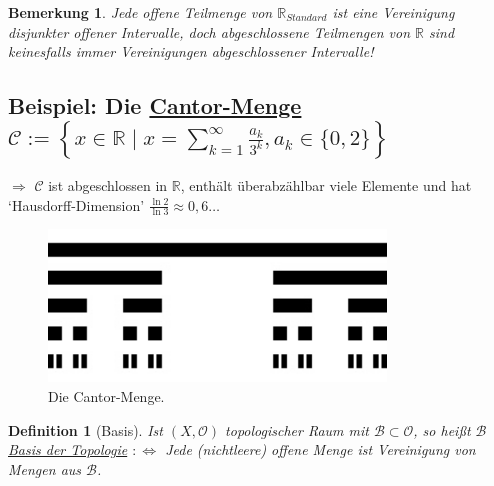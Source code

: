 \documentclass[a4paper,11pt,notitlepage]{report}
\newtheorem{definition}{Definition}[chapter]
\newtheorem{remark}{Bemerkung}[chapter]
\newcommand{\R}{{\ensuremath{\mathbb{R}}}}
\newcommand{\OO}{{\ensuremath{\mathcal{O}}}}
\newenvironment{bsp}[1]
{
\setlength{\fboxsep}{10pt}
\subsection*{Beispiel: #1}
\begin{upshape}
}
{
\end{upshape}
}
\begin{document}
\begin{remark}
	Jede offene Teilmenge von $\R_{Standard}$ ist eine Vereinigung disjunkter offener Intervalle, doch abgeschlossene Teilmengen von $\R$ sind keinesfalls immer Vereinigungen abgeschlossener Intervalle!
\end{remark}

\begin{bsp}{Die \underline{Cantor-Menge} $\mathcal{C}:= \left \{ x \in \R \mid x = \sum\limits_{k=1}^{\infty}{\frac{a_k}{3^k}}, a_k \in \{0,2\} \right \}$}
	$\Rightarrow$ $\mathcal{C}$ ist abgeschlossen in $\R$, enthält überabzählbar viele Elemente und hat `Hausdorff-Dimension' $\frac{\ln 2}{\ln 3} \approx 0,6 \ldots$
\end{bsp}

\begin{figure}[h]
\centering
\includegraphics[width=0.8\textwidth]{images/Cantormenge_5te_Iteration.jpg}
\caption{Die Cantor-Menge.}
\end{figure}

\begin{definition}[Basis]
	Ist $(X, \OO)$ topologischer Raum mit $\mathcal{B} \subset \OO$, 
	\newline
	so heißt $\mathcal{B}$ \underline{Basis der Topologie} $:\Leftrightarrow$ Jede (nichtleere) offene Menge ist Vereinigung von Mengen aus $\mathcal{B}$.
\end{definition}
\end{document}
